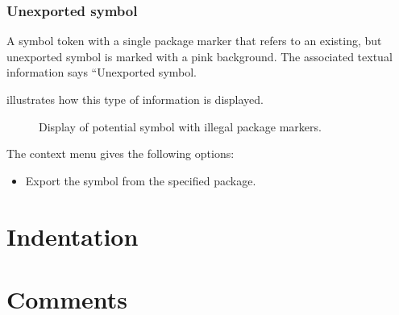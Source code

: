 \subsubsection{Unexported symbol}

A symbol token with a single package marker that refers to an
existing, but unexported symbol is marked with a pink background.  The
associated textual information says ``Unexported symbol.

 illustrates how this type of
information is displayed.

\begin{figure}
\begin{center}
\end{center}
\caption{\label{fig-unexported-symbol}
Display of potential symbol with illegal package markers.}
\end{figure}

The context menu gives the following options:

\begin{itemize}
\item Export the symbol from the specified package.
\end{itemize}

\section{Indentation}

\section{Comments}

